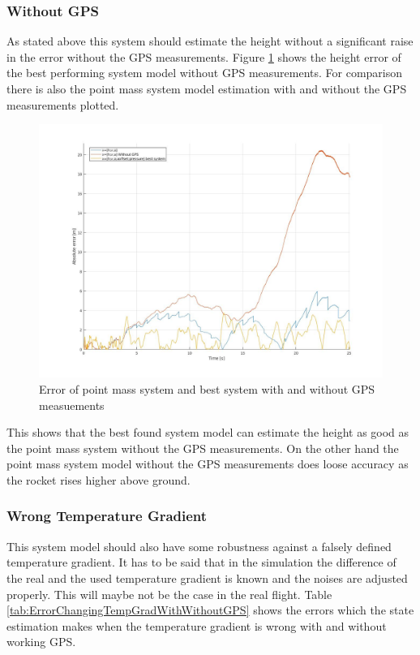 \subsubsection{Without GPS}
As stated above this system should estimate the height without a significant raise in the error without the GPS measurements.
Figure \ref{fig:ErrorWitoutGPS} shows the height error of the best performing system model without GPS measurements.
For comparison there is also the point mass system model estimation with and without the GPS measurements plotted.

\begin{figure}[h!]
 \centering
 \includegraphics[width=.8\textwidth]{./Pictures/ErrorPointMassBestSystemWithoutGPS.jpg}
 \caption{Error of point mass system and best system with and without GPS measuements}
 \label{fig:ErrorWitoutGPS}
\end{figure}

This shows that the best found system model can estimate the height as good as the point mass system without the GPS measurements.
On the other hand the point mass system model without the GPS measurements does loose accuracy as the rocket rises higher above ground.

\subsubsection{Wrong Temperature Gradient}
This system model should also have some robustness against a falsely defined temperature gradient.
It has to be said that in the simulation the difference of the real and the used temperature gradient is known and the noises are adjusted properly.
This will maybe not be the case in the real flight.
Table \ref{tab:ErrorChangingTempGradWithWithoutGPS} shows the errors which the state estimation makes when the temperature gradient is wrong with and without working GPS.

